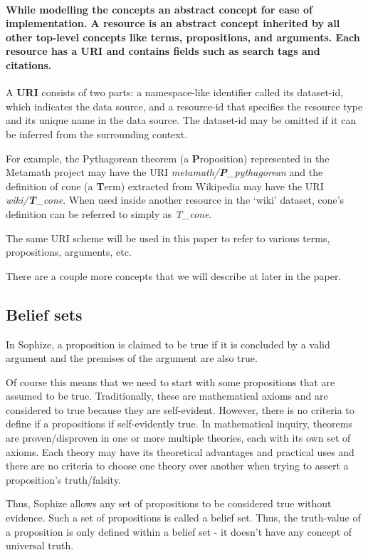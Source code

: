 \documentclass[a4paper]{article}
\begin{document}
\paragraph{While modelling the concepts an abstract concept for ease of implementation. A \textbf{resource} is an abstract concept inherited by all other top-level concepts like terms, propositions, and arguments. Each resource has a URI and contains fields such as search tags and citations.}

A \textbf{URI} consists of two parts: a namespace-like identifier called its dataset-id, which indicates the data source, and a resource-id that specifies the resource type and its unique name in the data source. The dataset-id may be omitted if it can be inferred from the surrounding context.

For example, the Pythagorean theorem (a \textbf{P}roposition) represented in the Metamath project may have the URI \emph{metamath/\textbf{P}\_pythagorean} and the definition of cone (a \textbf{T}erm) extracted from Wikipedia may have the URI \emph{wiki/\textbf{T}\_cone}. When used inside another resource in the `wiki' dataset, cone's definition can be referred to simply as \emph{T\_cone}.

The same URI scheme will be used in this paper to refer to various terms, propositions, arguments, etc.

There are a couple more concepts that we will describe at later in the paper.


\subsection{Belief sets}

In Sophize, a proposition is claimed to be true if it is concluded by a valid argument and the premises of the argument are also true.

Of course this means that we need to start with some propositions that are assumed to be true. Traditionally, these are mathematical axioms and are considered to true because they are self-evident. However, there is no criteria to define if a propositions if self-evidently true. In mathematical inquiry, theorems are proven/disproven in one or more multiple theories, each with its own set of axioms. Each theory may have its theoretical advantages and practical uses and there are no criteria to choose one theory over another when trying to assert a proposition's truth/falsity.

Thus, Sophize allows any set of propositions to be considered true without evidence. Such a set of propositions is called a belief set. Thus, the truth-value of a proposition is only defined within a belief set - it doesn't have any concept of universal truth. 
\end{document}
